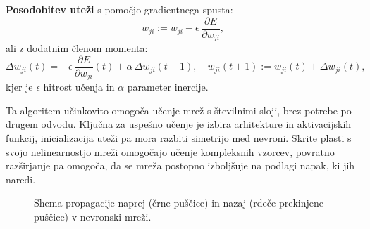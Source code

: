 \textbf{Posodobitev uteži} s pomočjo gradientnega spusta:
\[
w_{ji} := w_{ji} - \epsilon \, \frac{\partial E}{\partial w_{ji}},
\]
ali z dodatnim členom momenta:
\[
\Delta w_{ji}(t) = -\epsilon \, \frac{\partial E}{\partial w_{ji}}(t) + \alpha\, \Delta w_{ji}(t-1),
\quad
w_{ji}(t+1) := w_{ji}(t) + \Delta w_{ji}(t),
\]
kjer je $\epsilon$ hitrost učenja in $\alpha$ parameter inercije.

Ta algoritem učinkovito omogoča učenje mrež s številnimi sloji, brez potrebe po drugem odvodu. Ključna za uspešno učenje je izbira arhitekture in aktivacijskih funkcij, inicializacija uteži pa mora razbiti simetrijo med nevroni. Skrite plasti s svojo nelinearnostjo mreži omogočajo učenje kompleksnih vzorcev, povratno razširjanje pa omogoča, da se mreža postopno izboljšuje na podlagi napak, ki jih naredi.

\begin{figure}[H]
\centering
{}
\caption{Shema propagacije naprej (črne puščice) in nazaj (rdeče prekinjene puščice) v nevronski mreži.}
\label{fig:backprop-shema}
\end{figure}
